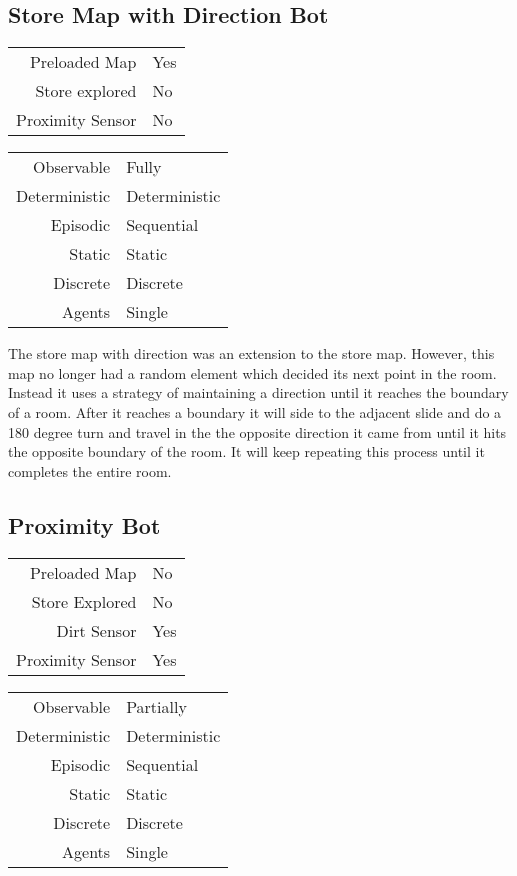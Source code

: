 \documentclass[letterpaper]{article}
\begin{document}
\subsection{Store Map with Direction Bot}
\begin{tabular}{ r | l }  
	Preloaded Map 		& Yes \\
	Store explored		& No \\
	Proximity Sensor 	& No \\
\end{tabular}
\quad
\begin{tabular}{ r | l }  
	Observable		& Fully 		\\
	Deterministic	& Deterministic \\
	Episodic		& Sequential	\\
	Static		 	& Static 		\\
	Discrete 		& Discrete 		\\
	Agents		 	& Single 		\\	
\end{tabular}
The store map with direction was an extension to the store map. However, this map no longer had a random element which decided its next point in the room. Instead it uses a strategy of maintaining a direction until it reaches the boundary of a room. After it reaches a boundary it will side to the adjacent slide and do a 180 degree turn and travel in the the opposite direction it came from until it hits the opposite boundary of the room. It will keep repeating this process until it completes the entire room.

\subsection{Proximity Bot}

\begin{tabular}{ r | l }  
	Preloaded Map 		& No \\
	Store Explored 		& No \\
	Dirt Sensor 		& Yes \\
	Proximity Sensor 	& Yes \\
\end{tabular}
\quad
\begin{tabular}{ r | l }  
	Observable		& Partially		\\
	Deterministic	& Deterministic \\
	Episodic		& Sequential 	\\
	Static		 	& Static 		\\
	Discrete 		& Discrete 		\\
	Agents		 	& Single 		\\	
\end{tabular} 
 	
\end{document}
